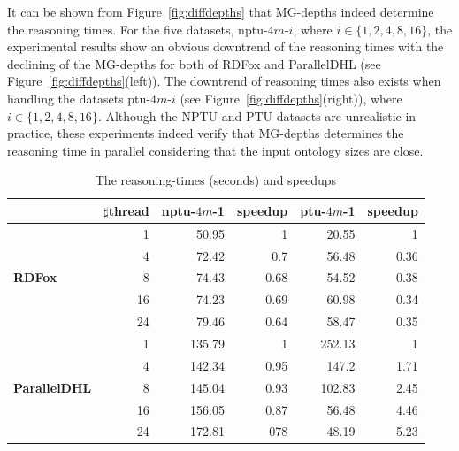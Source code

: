 It can be shown from Figure~\ref{fig:diffdepths} that MG-depths indeed determine
the reasoning times.
For the five datasets, nptu-$4m$-$i$, where $i\in\{1,2,4,8,16\}$, the experimental
results show an obvious downtrend of the reasoning times with the declining of the MG-depths for
both of RDFox and ParallelDHL (see Figure~\ref{fig:diffdepths}(left)).
The downtrend of reasoning times also exists
when handling the datasets ptu-$4m$-$i$ (see Figure~\ref{fig:diffdepths}(right)), where $i\in\{1,2,4,8,16\}$.
Although the NPTU and PTU datasets are unrealistic in practice, these experiments indeed
verify that MG-depths determines the reasoning time in parallel
considering that the input ontology sizes are close.

\begin{table}
\centering
\caption{The reasoning-times (seconds) and speedups}
\begin{tabular}{|l|r|r|r|r|r|}
\hline
&\small$\sharp$thread&nptu-$4m$-1&speedup&ptu-$4m$-1&speedup\\
\hline
\multirow{5}{*}{ \textbf{RDFox}}&1&50.95&1&20.55&1\\
                                &4&72.42&0.7&56.48&0.36\\
                                &8&74.43&0.68&54.52&0.38\\
                                &16&74.23&0.69&60.98&0.34\\
                                &24&79.46&0.64&58.47&0.35\\
\hline
\multirow{5}{*}{ \small{\textbf{ParallelDHL}}}&1&135.79&1&252.13&1\\
                                &4&142.34&0.95&147.2&1.71\\
                                &8&145.04&0.93&102.83&2.45\\
                                &16&156.05&0.87&56.48&4.46\\
                                &24&172.81&078&48.19&5.23\\
\hline
\end{tabular}
\label{tab:speedup}
\end{table}

